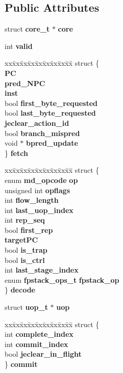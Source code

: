 \subsection*{Public Attributes}
\begin{CompactItemize}
\item 
struct {\bf core\_\-t} $\ast$ {\bf core}
\item 
int {\bf valid}
\item 
\begin{tabbing}
xx\=xx\=xx\=xx\=xx\=xx\=xx\=xx\=xx\=\kill
struct \{\\
 {\bf PC}\\
 {\bf pred\_NPC}\\
 {\bf inst}\\
\>bool {\bf first\_byte\_requested}\\
\>bool {\bf last\_byte\_requested}\\
 {\bf jeclear\_action\_id}\\
\>bool {\bf branch\_mispred}\\
\>void $\ast$ {\bf bpred\_update}\\
\} {\bf fetch}\\

\end{tabbing}\item 
\begin{tabbing}
xx\=xx\=xx\=xx\=xx\=xx\=xx\=xx\=xx\=\kill
struct \{\\
\>enum {\bf md\_opcode} {\bf op}\\
\>unsigned int {\bf opflags}\\
\>int {\bf flow\_length}\\
\>int {\bf last\_uop\_index}\\
\>int {\bf rep\_seq}\\
\>bool {\bf first\_rep}\\
 {\bf targetPC}\\
\>bool {\bf is\_trap}\\
\>bool {\bf is\_ctrl}\\
\>int {\bf last\_stage\_index}\\
\>enum {\bf fpstack\_ops\_t} {\bf fpstack\_op}\\
\} {\bf decode}\\

\end{tabbing}\item 
struct {\bf uop\_\-t} $\ast$ {\bf uop}
\item 
\begin{tabbing}
xx\=xx\=xx\=xx\=xx\=xx\=xx\=xx\=xx\=\kill
struct \{\\
\>int {\bf complete\_index}\\
\>int {\bf commit\_index}\\
\>bool {\bf jeclear\_in\_flight}\\
\} {\bf commit}\\


\end{tabbing}
\end{CompactItemize}
